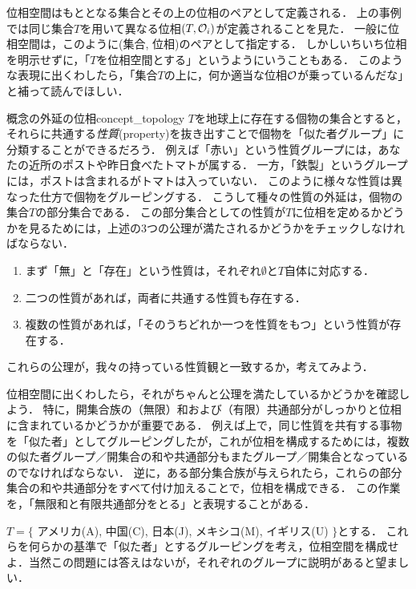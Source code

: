\documentclass[11pt,a4paper, dvipdfmx]{jsarticle}
\begin{document}
位相空間はもととなる集合とその上の位相のペアとして定義される．
上の事例では同じ集合$T$を用いて異なる位相$(T, \mathcal{O}_i)$が定義されることを見た．
一般に位相空間は，このように(集合, 位相)のペアとして指定する．
しかしいちいち位相を明示せずに，「$T$を位相空間とする」というようにいうこともある．
このような表現に出くわしたら，「集合$T$の上に，何か適当な位相$\mathcal{O}$が乗っているんだな」と補って読んでほしい．


\begin{rei}{概念の外延の位相}{concept_topology}
$T$を地球上に存在する個物の集合とすると，それらに共通する\emph{性質}(property)を抜き出すことで個物を「似た者グループ」に分類することができるだろう．
例えば「赤い」という性質グループには，あなたの近所のポストや昨日食べたトマトが属する．
一方，「鉄製」というグループには，ポストは含まれるがトマトは入っていない．
このように様々な性質は異なった仕方で個物をグルーピングする．
こうして種々の性質の外延は，個物の集合$T$の部分集合である．
この部分集合としての性質が$T$に位相を定めるかどうかを見るためには，上述の3つの公理が満たされるかどうかをチェックしなければならない．
\begin{enumerate}
 \item まず「無」と「存在」という性質は，それぞれ$\emptyset$と$T$自体に対応する．
 \item 二つの性質があれば，両者に共通する性質も存在する．
 \item 複数の性質があれば，「そのうちどれか一つを性質をもつ」という性質が存在する．
\end{enumerate}
これらの公理が，我々の持っている性質観と一致するか，考えてみよう．
\end{rei}


位相空間に出くわしたら，それがちゃんと公理を満たしているかどうかを確認しよう．
特に，開集合族の（無限）和および（有限）共通部分がしっかりと位相に含まれているかどうかが重要である．
例えば上で，同じ性質を共有する事物を「似た者」としてグルーピングしたが，これが位相を構成するためには，複数の似た者グループ／開集合の和や共通部分もまたグループ／開集合となっているのでなければならない．
逆に，ある部分集合族が与えられたら，これらの部分集合の和や共通部分をすべて付け加えることで，位相を構成できる．
この作業を，「無限和と有限共通部分をとる」と表現することがある．

\begin{renshu}{}{}
 $T = \{$ アメリカ(A), 中国(C), 日本(J), メキシコ(M), イギリス(U) $\}$とする．
これらを何らかの基準で「似た者」とするグルーピングを考え，位相空間を構成せよ．当然この問題には答えはないが，それぞれのグループに説明があると望ましい．
\end{renshu}
\end{document}
